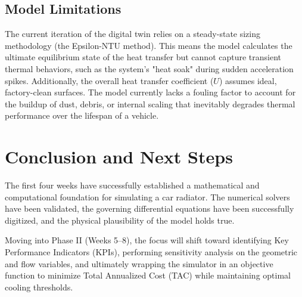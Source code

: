 \documentclass[12pt, a4paper]{article}
\begin{document}
\subsection{Model Limitations}
The current iteration of the digital twin relies on a steady-state sizing methodology (the Epsilon-NTU method). This means the model calculates the ultimate equilibrium state of the heat transfer but cannot capture transient thermal behaviors, such as the system's "heat soak" during sudden acceleration spikes. Additionally, the overall heat transfer coefficient ($U$) assumes ideal, factory-clean surfaces. The model currently lacks a fouling factor to account for the buildup of dust, debris, or internal scaling that inevitably degrades thermal performance over the lifespan of a vehicle.

\section{Conclusion and Next Steps}
The first four weeks have successfully established a mathematical and computational foundation for simulating a car radiator. The numerical solvers have been validated, the governing differential equations have been successfully digitized, and the physical plausibility of the model holds true. 

Moving into Phase II (Weeks 5–8), the focus will shift toward identifying Key Performance Indicators (KPIs), performing sensitivity analysis on the geometric and flow variables, and ultimately wrapping the simulator in an objective function to minimize Total Annualized Cost (TAC) while maintaining optimal cooling thresholds.
\end{document}
